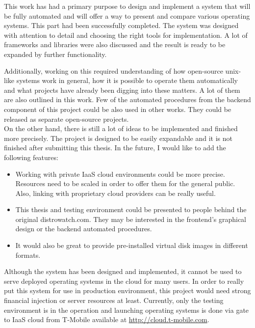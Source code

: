 \documentclass[thesis=B,english]{FITthesis}[2013/04/26]
\begin{document}
\begin{conclusion}
\label{chapter:conclusion}
This work has had a primary purpose to design and implement a system that will be fully automated and will offer a way to present and compare various operating systems. This part had been successfully completed. The system was designed with attention to detail and choosing the right tools for implementation. A lot of frameworks and libraries were also discussed and the result is ready to be expanded by further functionality.

Additionally, working on this required understanding of how open-source unix-like systems work in general, how it is possible to operate them automatically and what projects have already been digging into these matters. A lot of them are also outlined in this work. Few of the automated procedures from the backend component of this project could be also used in other works. They could be released as separate open-source projects. \\

On the other hand, there is still a lot of ideas to be implemented and finished more precisely. The project is designed to be easily expandable and it is not finished after submitting this thesis. In the future, I would like to add the following features:
\begin{itemize}
	\item Working with private IaaS cloud environments could be more precise. Resources need to be scaled in order to offer them for the general public. Also, linking with proprietary cloud providers can be really useful.
	\item This thesis and testing environment could be presented to people behind the original distrowatch.com. They may be interested in the frontend's graphical design or the backend automated procedures.
	\item It would also be great to provide pre-installed virtual disk images in different formats.
\end{itemize}

Although the system has been designed and implemented, it cannot be used to serve deployed operating systems in the cloud for many users. In order to really put this system for use in production environment, this project would need strong financial injection or server resources at least. Currently, only the testing environment is in the operation and launching operating systems is done via gate to IaaS cloud from T-Mobile available at \url{http://cloud.t-mobile.com}.

\end{conclusion}
\end{document}
